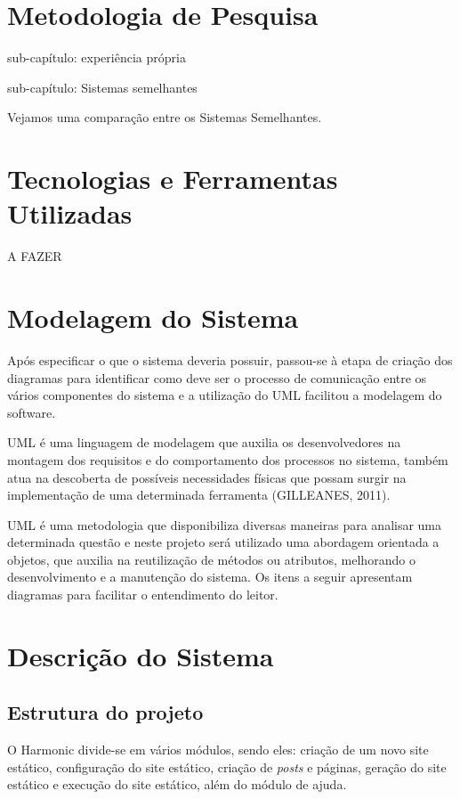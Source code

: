 \documentclass[ppginf, pep]{esinucpel}
\begin{document}
\chapter{Metodologia de Pesquisa}

sub-capítulo: experiência própria

sub-capítulo: Sistemas semelhantes

Vejamos uma comparação entre os Sistemas Semelhantes.

\chapter{Tecnologias e Ferramentas Utilizadas}

A FAZER

\chapter{Modelagem do Sistema}

Após especificar o que o sistema deveria possuir, passou-se à etapa de criação dos diagramas para identificar como deve ser o processo de comunicação entre os vários componentes do sistema e a utilização do UML facilitou a modelagem do software.

UML é uma linguagem de modelagem que auxilia os desenvolvedores na montagem dos requisitos e do comportamento dos processos no sistema, também atua na descoberta de possíveis necessidades físicas que possam surgir na implementação de uma determinada ferramenta (GILLEANES, 2011). %

UML é uma metodologia que disponibiliza diversas maneiras para analisar uma determinada questão e neste projeto será utilizado uma abordagem orientada a objetos, que auxilia na reutilização de métodos ou atributos, melhorando o desenvolvimento e a manutenção do sistema. Os itens a seguir apresentam diagramas para facilitar o entendimento do leitor.



\chapter{Descrição do Sistema}

\section{Estrutura do projeto}

O Harmonic divide-se em vários módulos, sendo eles: criação de um novo site estático, configuração do site estático, criação de \textit{posts} e páginas, geração do site estático e execução do site estático, além do módulo de ajuda.
\end{document}
